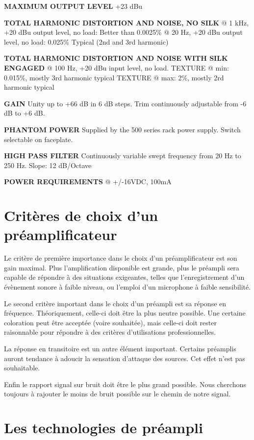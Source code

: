 \documentclass[
  letterpaper,
  DIV=11,
  numbers=noendperiod]{scrreprt}
\begin{document}
\textbf{MAXIMUM OUTPUT LEVEL} +23 dBu

\textbf{TOTAL HARMONIC DISTORTION AND NOISE, NO SILK} @ 1 kHz, +20 dBu
output level, no load: Better than 0.0025\% @ 20 Hz, +20 dBu output
level, no load: 0.025\% Typical (2nd and 3rd harmonic)

\textbf{TOTAL HARMONIC DISTORTION AND NOISE WITH SILK ENGAGED} @ 100 Hz,
+20 dBu input level, no load. TEXTURE @ min: 0.015\%, mostly 3rd
harmonic typical TEXTURE @ max: 2\%, mostly 2rd harmonic typical

\textbf{GAIN} Unity up to +66 dB in 6 dB steps. Trim continuously
adjustable from -6 dB to +6 dB.

\textbf{PHANTOM POWER} Supplied by the 500 series rack power supply.
Switch selectable on faceplate.

\textbf{HIGH PASS FILTER} Continuously variable swept frequency from 20
Hz to 250 Hz. Slope: 12 dB/Octave

\textbf{POWER REQUIREMENTS} @ +/-16VDC, 100mA

\hypertarget{crituxe8res-de-choix-dun-pruxe9amplificateur}{%
\section{Critères de choix d'un
préamplificateur}\label{crituxe8res-de-choix-dun-pruxe9amplificateur}}

Le critère de première importance dans le choix d'un préamplificateur
est son gain maximal. Plus l'amplification disponible est grande, plus
le préampli sera capable de répondre à des situations exigeantes, telles
que l'enregistrement d'un évènement sonore à faible niveau, ou l'emploi
d'un microphone à faible sensibilité.

Le second critère important dans le choix d'un préampli est sa réponse
en fréquence. Théoriquement, celle-ci doit être la plus neutre possible.
Une certaine coloration peut être acceptée (voire souhaitée), mais
celle-ci doit rester raisonnable pour répondre à des critères
d'utilisations professionnelles.

La réponse en transitoire est un autre élément important. Certains
préamplis auront tendance à adoucir la sensation d'attaque des sources.
Cet effet n'est pas souhaitable.

Enfin le rapport signal sur bruit doit être le plus grand possible. Nous
cherchons toujours à rajouter le moins de bruit possible sur le chemin
de notre signal.

\hypertarget{les-technologies-de-pruxe9ampli}{%
\section{Les technologies de
préampli}\label{les-technologies-de-pruxe9ampli}}
\end{document}
